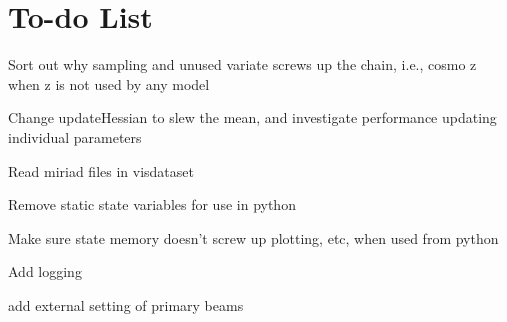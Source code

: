 \section{To-do List}

\begin{list}{}{ \leftmargin {} \addtolength{\leftmargin}{\labelsep}}

\item[] {Sort out why sampling and unused variate screws up the chain, i.e., cosmo z when z is not used by any model}
\item[] {Change updateHessian to slew the mean, and investigate performance updating individual parameters}
\item[] {Read miriad files in visdataset}
\item[] {Remove static state variables for use in python}
\item[] {Make sure state memory doesn't screw up plotting, etc, when used from python}
\item[] {Add logging}
\item[] {add external setting of primary beams}

\end{list}
